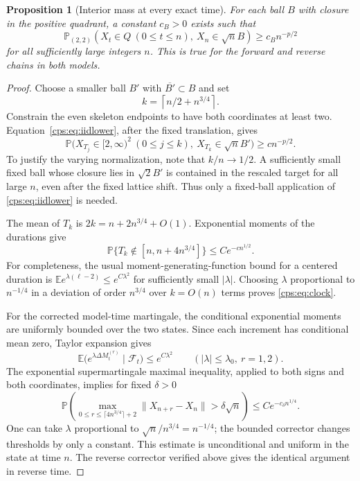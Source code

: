 \documentclass[11pt,letterpaper]{article}
\numberwithin{equation}{section}
\newtheorem{proposition}[theorem]{Proposition}
\theoremstyle{remark}\newtheorem{remark}[theorem]{Remark}
\newcommand{\PP}{\mathbb P}
\newcommand{\EE}{\mathbb E}
\newcommand{\norm}[1]{\lVert#1\rVert}
\begin{document}
\begin{proposition}[Interior mass at every exact time]\label{cps:prop:mass}
For each ball $B$ with closure in the positive quadrant, a constant $c_B>0$ exists such that
\begin{equation}\label{cps:eq:mass}
 \PP_{(2,2)}(X_t\in Q\ (0\le t\le n),\ X_n\in\sqrt nB)
 \ge c_Bn^{-p/2}
\end{equation}
for all sufficiently large integers $n$. This is true for the forward and reverse chains in both models.
\end{proposition}
\begin{proof}
Choose a smaller ball $B'$ with $\overline{B'}\subset B$ and set
\begin{equation}\label{cps:eq:kchoice}
 k=\left\lceil n/2+n^{3/4}\right\rceil.
\end{equation}
Constrain the even skeleton endpoints to have both coordinates at least two. Equation~\eqref{cps:eq:iidlower}, after the fixed translation, gives
\begin{equation}\label{cps:eq:skeletonmass}
 \PP\bigl(X_{T_j}\in[2,\infty)^2\ (0\le j\le k),\
 X_{T_k}\in\sqrt nB'\bigr)\ge cn^{-p/2}.
\end{equation}
To justify the varying normalization, note that $k/n\to1/2$. A sufficiently small fixed ball whose closure lies in $\sqrt2B'$ is contained in the rescaled target for all large $n$, even after the fixed lattice shift. Thus only a fixed-ball application of \eqref{cps:eq:iidlower} is needed.

The mean of $T_k$ is $2k=n+2n^{3/4}+O(1)$. Exponential moments of the durations give
\begin{equation}\label{cps:eq:clock}
 \PP\{T_k\notin[n,n+4n^{3/4}]\}\le Ce^{-cn^{1/2}}.
\end{equation}
For completeness, the usual moment-generating-function bound for a centered duration is $\EE e^{\lambda(\ell-2)}\le e^{C\lambda^2}$ for sufficiently small $|\lambda|$. Choosing $\lambda$ proportional to $n^{-1/4}$ in a deviation of order $n^{3/4}$ over $k=O(n)$ terms proves \eqref{cps:eq:clock}.

For the corrected model-time martingale, the conditional exponential moments are uniformly bounded over the two states. Since each increment has conditional mean zero, Taylor expansion gives
\begin{equation}
 \EE\bigl(e^{\lambda\Delta M_t^{(r)}}\mid\mathcal F_t\bigr)
 \le e^{C\lambda^2}\qquad(|\lambda|\le\lambda_0,\ r=1,2).
\end{equation}
The exponential supermartingale maximal inequality, applied to both signs and both coordinates, implies for fixed $\delta>0$
\begin{equation}\label{cps:eq:window}
 \PP\!\left(\max_{0\le r\le\lceil4n^{3/4}\rceil+2}
 \norm{X_{n+r}-X_n}>\delta\sqrt n\right)
 \le Ce^{-c_\delta n^{1/4}}.
\end{equation}
One can take $\lambda$ proportional to $\sqrt n/n^{3/4}=n^{-1/4}$; the bounded corrector changes thresholds by only a constant. This estimate is unconditional and uniform in the state at time $n$. The reverse corrector verified above gives the identical argument in reverse time.


\end{proof}
\end{document}
